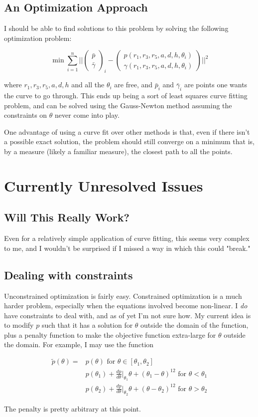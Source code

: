 \documentclass[12pt, letterpaper]{article}
\begin{document}
\subsection*{An Optimization Approach}

I should be able to find solutions to this problem by solving the following optimization problem:

\[\min \sum_{i=1}^n\bigg|\bigg|\begin{pmatrix}\bar{p} \\ \bar{\gamma}\end{pmatrix}_i -
\begin{pmatrix}p(r_1,r_3,r_5,a,d,h,\theta_i) \\ \gamma(r_1,r_3,r_5,a,d,h,\theta_i)\end{pmatrix} \bigg|\bigg|^2\]

where \(r_1,r_3,r_5,a,d,h\) and all the \(\theta_i\) are free, and \(\bar{p}_i\) and \(\bar{\gamma}_i\) are points one wants the curve to go through. This ends up being a sort of least squares curve fitting problem, and can be solved using the Gauss-Newton method assuming the constraints on \(\theta\) never come into play.

One advantage of using a curve fit over other methods is that, even if there isn't a possible exact solution, the problem should still converge on a minimum that is, by a measure (likely a familiar measure), the closest path to all the points.

\section*{Currently Unresolved Issues}
\subsection*{Will This Really Work?}
Even for a relatively simple application of curve fitting, this seems very complex to me, and I wouldn't be surprised if I missed a way in which this could "break."
\subsection*{Dealing with constraints}
Unconstrained optimization is fairly easy. Constrained optimization is a much harder problem, especially when the equations involved become non-linear. I \emph{do} have constraints to deal with, and as of yet I'm not sure how. My current idea is to modify \(p\) such that it has a solution for \(\theta\) outside the domain of the function, plus a penalty function to make the objective function extra-large for \(\theta\) outside the domain.  For example, I may use the function

\begin{align*}\tilde{p}(\theta)=&p(\theta) \text{ for } \theta \in [\theta_1,\theta_2]\\
&p(\theta_{1})+\frac{dp}{d\theta}\bigg|_{\theta_1}\theta+(\theta_1-\theta)^{12} \text{ for } \theta < \theta_1\\
&p(\theta_{2})+\frac{dp}{d\theta}\bigg|_{\theta_2}\theta+(\theta-\theta_2)^{12} \text{ for } \theta > \theta_2\end{align*}

The penalty is pretty arbitrary at this point.
\end{document}
